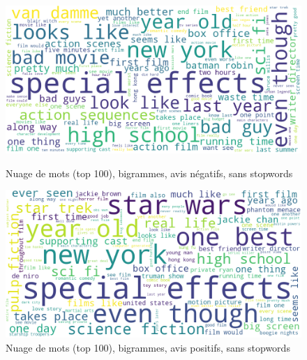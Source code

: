 \documentclass{article}
\begin{document}
\begin{figure}[H]
    \centering
    \begin{minipage}{0.48\textwidth}
        \includegraphics[width=\textwidth]{./src/movies/wordclouds_neg_nostopwords_2grams.png} 
        \caption{Nuage de mots (top 100), bigrammes, avis négatifs, sans stopwords}
        \label{fig:neg_bigrams}
    \end{minipage}
    \hfill
    \begin{minipage}{0.48\textwidth}
        \includegraphics[width=\textwidth]{./src/movies/wordclouds_pos_nostopwords_2grams.png} 
        \caption{Nuage de mots (top 100), bigrammes, avis positifs, sans stopwords}
        \label{fig:pos_bigrams}
    \end{minipage}
\end{figure}
\end{document}
